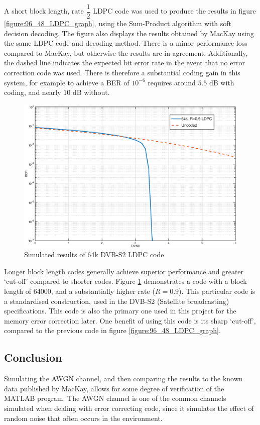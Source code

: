 \documentclass[11pt]{article}
\numberwithin{equation}{subsection}
\begin{document}
A short block length, rate $\dfrac{1}{2}$ LDPC code was used to produce the results in figure \ref{figure:96_48_LDPC_graph}, using the Sum-Product algorithm with soft decision decoding. The figure also displays the results obtained by MacKay using the same LDPC code and decoding method. There is a minor performance loss compared to MacKay, but otherwise the results are in agreement. Additionally, the dashed line indicates the expected bit error rate in the event that no error correction code was used. There is therefore a substantial coding gain in this system, for example to achieve a BER of $10^{-6}$ requires around $5.5$ dB with coding, and nearly $10$ dB without.

\begin{figure}[h]
\centering
\includegraphics[scale=0.6]{dvbs2_graph}
\caption{Simulated results of 64k DVB-S2 LDPC code}
\label{figure:64k_LDPC_graph}
\end{figure}

Longer block length codes generally achieve superior performance and greater `cut-off' compared to shorter codes. Figure \ref{figure:64k_LDPC_graph} demonstrates a code with a block length of $64000$, and a substantially higher rate ($R=0.9$). This particular code is a standardised construction, used in the DVB-S2 (Satellite broadcasting) specifications. This code is also the primary one used in this project for the memory error correction later. One benefit of using this code is its sharp `cut-off', compared to the previous code in figure \ref{figure:96_48_LDPC_graph}.

\subsection{Conclusion}
Simulating the AWGN channel, and then comparing the results to the known data published by MacKay, allows for some degree of verification of the MATLAB program. The AWGN channel is one of the common channels simulated when dealing with error correcting code, since it simulates the effect of random noise that often occurs in the environment. 
\end{document}
